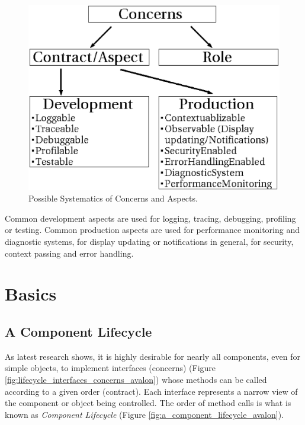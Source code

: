\documentclass[a4paper,10pt]{llncs}
\begin{document}
\begin{figure}[ht]
\begin{center}
\includegraphics[scale=0.3]{possible_systematics_of_concerns_and_aspects}
\caption{Possible Systematics of Concerns and Aspects.}
\label{fig:possible_systematics_of_concerns_and_aspects}
\end{center}
\end{figure}

Common development aspects are used for logging, tracing, debugging, profiling
or testing. Common production aspects are used for performance monitoring and
diagnostic systems, for display updating or notifications in general, for
security, context passing and error handling.

%
%
\section{Basics}
\subsection{A Component Lifecycle}

As latest research shows, it is highly desirable for nearly all components,
even for simple objects, to implement interfaces (concerns)
(Figure \ref{fig:lifecycle_interfaces_concerns_avalon})
whose methods can be called according to a given order (contract).
Each interface represents a narrow view of the component or object being controlled.
The order of method calls is what is known as \emph{Component Lifecycle}
(Figure \ref{fig:a_component_lifecycle_avalon}).
\end{document}
